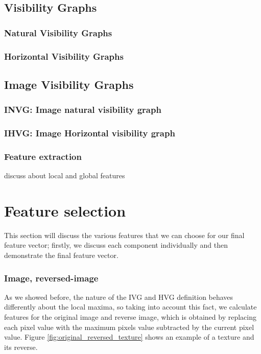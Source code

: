 \documentclass[conference]{IEEEtran}
\begin{document}
\subsection{Visibility Graphs}
\subsubsection{Natural Visibility Graphs}
\subsubsection{Horizontal Visibility Graphs}

\subsection{Image Visibility Graphs}
\subsubsection{INVG: Image natural visibility graph}
\subsubsection{IHVG: Image Horizontal visibility graph}
\subsubsection{Feature extraction }
discuss about local and global features



\section{Feature selection}
This section will discuss the various features that we can choose for our final feature vector; firstly, we discuss each component individually and then demonstrate the final feature vector.


\subsubsection{\textbf{Image, reversed-image}}
As we showed before, the nature of the IVG and HVG definition behaves differently about the local maxima, so taking into account this fact, we calculate features for the original image and reverse image, which is obtained by replacing each pixel value with the maximum pixels value subtracted by the current pixel value.
Figure \ref{fig:original_reversed_texture} shows an example of a texture and its reverse.
\end{document}
